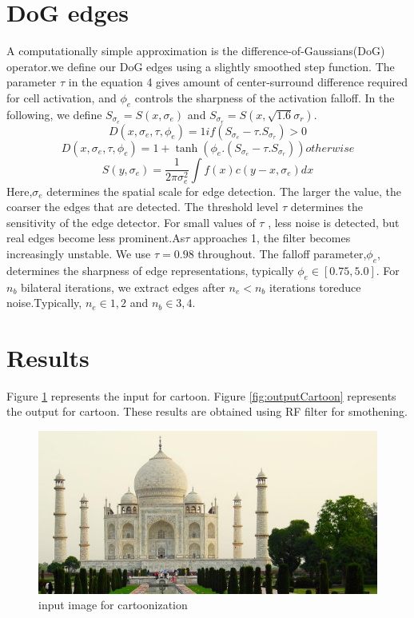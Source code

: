 \documentclass[conference]{IEEEtran}
\begin{document}
 \section{DoG edges}
 	A computationally simple approximation is the difference-of-Gaussians(DoG) operator.we define our DoG edges using a slightly smoothed step function. The parameter $\tau$ in the equation 4 gives amount of center-surround difference required for cell activation, and $\phi_e$ controls the sharpness of the activation falloff. In the following, we define $S_{\sigma_e} = S(x,\sigma_e)$ and $S_{\sigma_r} = S(x,\sqrt{1.6}\sigma_r)$.
 	$$D(x,\sigma_e,\tau,\phi_e) = 1  if   (S_{\sigma_e}-\tau.S_{\sigma_r}) > 0$$
 	$$D(x,\sigma_e,\tau,\phi_e) = 1+\tanh(\phi_e.(S_{\sigma_e}-\tau.S_{\sigma_r}))  otherwise$$
 	$$S(y,\sigma_e) = \frac{1}{2\pi\sigma_e^2}\int f(x)c(y-x,\sigma_e) dx $$
 	Here,$\sigma_e$ determines the spatial scale for edge detection. The larger the value, the coarser the edges that are detected. The threshold level $\tau$ determines the sensitivity of the edge detector. For small values of $\tau$ , less noise is detected, but real edges become less prominent.As$\tau$ approaches 1, the filter becomes increasingly unstable. We use $\tau=0.98$ throughout.  The falloff parameter,$\phi_e$, determines the sharpness of edge representations, typically $\phi_e \in [0.75,5.0]$. For $n_b$ bilateral iterations, we extract edges after $n_e<n_b$ iterations toreduce noise.Typically, $n_e \in {1,2}$ and $n_b \in {3,4}$.
 
 \section{Results}
 Figure \ref{fig:inputCartoon} represents the input for cartoon.
 Figure \ref{fig:outputCartoon} represents the output for cartoon.
 These results are obtained using RF filter for smothening. 
 
 \begin{figure}
 	\includegraphics[width = \linewidth]{taj.jpg}
 	\caption{input image for cartoonization}
 	\label{fig:inputCartoon}
 \end{figure}
\end{document}

